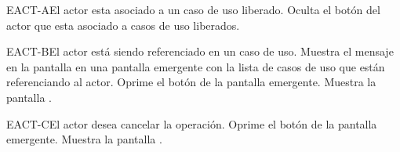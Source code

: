 	\begin{UCtrayectoriaA}{EACT-A}{El actor esta asociado a un caso de uso liberado.}
		\UCpaso[\UCsist] Oculta el botón \eliminar del actor que esta asociado a casos de uso liberados.
	\end{UCtrayectoriaA}

	\begin{UCtrayectoriaA}{EACT-B}{El actor está siendo referenciado en un caso de uso.}
		\UCpaso[\UCsist] Muestra el mensaje  en la pantalla  en una pantalla emergente con la lista de casos de uso que están referenciando al actor.
		\UCpaso[\UCactor] Oprime el botón  de la pantalla emergente.
		\UCpaso[\UCsist] Muestra la pantalla .
	\end{UCtrayectoriaA}

	\begin{UCtrayectoriaA}{EACT-C}{El actor desea cancelar la operación.}
		\UCpaso[\UCactor] Oprime el botón  de la pantalla emergente.
		\UCpaso[\UCsist] Muestra la pantalla .
	\end{UCtrayectoriaA}
	

